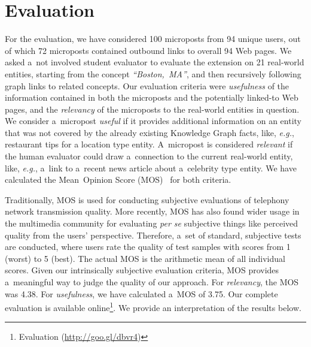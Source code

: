\documentclass[runningheads,a4paper]{llncs}
\begin{document}
\section{Evaluation}
For the evaluation, we have considered 100 microposts from 94 unique users,
out of which 72 microposts contained outbound links to overall 94 Web pages.
We asked a~not involved student evaluator
to evaluate the extension on 21 real-world entities, starting from the concept
\emph{``Boston,~MA''}, and then recursively following graph links to related concepts.
Our evaluation criteria were \emph{usefulness} of the information
contained in both the microposts and the potentially linked-to Web pages,
and the \emph{relevancy} of the microposts to the real-world entities in question.
We consider a~micropost \emph{useful} if it provides additional information on an entity
that was not covered by the already existing Knowledge Graph facts, like, \emph{e.g.},
restaurant tips for a location type entity.
A~micropost is considered \emph{relevant} if the human evaluator could draw a~connection
to the current real-world entity, like, \emph{e.g.},
a~link to a~recent news article about a~celebrity type entity.
We have calculated the Mean~Opinion Score (MOS)~\cite{mos1998} for both criteria.

Traditionally, MOS is used for conducting subjective evaluations
of telephony network transmission quality.
More recently, MOS has also found wider usage in the multimedia community
for evaluating \emph{per se} subjective things
like perceived quality from the users' perspective.
Therefore, a~set of standard, subjective tests are conducted,
where users rate the quality of test samples
with scores from 1 (worst) to 5 (best).
The actual MOS is the arithmetic mean of all individual scores.
Given our intrinsically subjective evaluation criteria,
MOS provides a~meaningful way to judge the quality of our approach.
For \emph{relevancy}, the MOS was 4.38.
For \emph{usefulness}, we have calculated a~MOS of 3.75.
Our complete evaluation is available online\footnote{Evaluation (\url{http://goo.gl/dbvr4})}.
We provide an interpretation of the results below.

\vspace{-0.7em}
\end{document}
